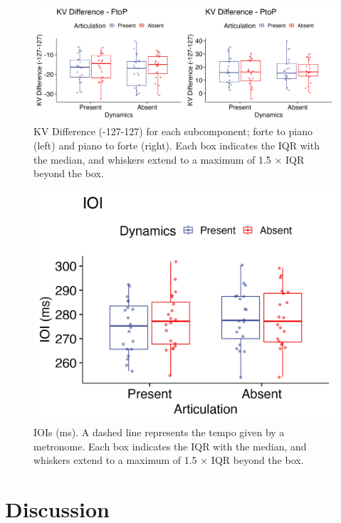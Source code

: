 \documentclass[
  man,floatsintext]{apa6}
\begin{document}
\begin{figure}
\includegraphics[width=1\linewidth]{manuscript_files/figure-latex/plot-vel-diff-1-1} \caption{\label{fig:vel-diff-1}KV Difference (-127-127) for each subcomponent; forte to piano (left) and piano to forte (right). Each box indicates the IQR with the median, and whiskers extend to a maximum of 1.5 × IQR beyond the box.}\label{fig:plot-vel-diff-1}
\end{figure}

\begin{figure}
\includegraphics[width=1\linewidth]{manuscript_files/figure-latex/plot-ioi-1-1} \caption{\label{fig:ioi-1}IOIs (ms). A dashed line represents the tempo given by a metronome. Each box indicates the IQR with the median, and whiskers extend to a maximum of 1.5 × IQR beyond the box.}\label{fig:plot-ioi-1}
\end{figure}

\clearpage

\hypertarget{discussion}{%
\section{Discussion}\label{discussion}}
\end{document}
